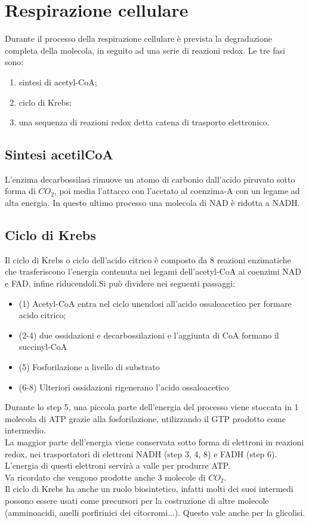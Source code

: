 \section{Respirazione cellulare}
Durante il processo della respirazione cellulare \`e prevista la degradazione completa della molecola, in seguito ad una serie di reazioni redox. Le tre fasi sono: 
\begin{enumerate}
    \item sintesi di acetyl-CoA;
    \item ciclo di Krebs; 
    \item una sequenza di reazioni redox detta catena di trasporto elettronico.
\end{enumerate}
\subsection{Sintesi acetilCoA}
L'enzima decarbossilasi rimuove un atomo di carbonio dall'acido piruvato sotto forma di $CO_2$, poi media l'attacco con l'acetato al coenzima-A con un legame ad alta energia. In questo ultimo processo una molecola di NAD\ap{+} \`e ridotta a NADH.
\subsection{Ciclo di Krebs}
Il ciclo di Krebs o ciclo dell'acido citrico \`e composto da 8 reazioni enzimatiche che trasferiscono l'energia contenuta nei legami dell'acetyl-CoA ai coenzimi NAD e FAD, infine riducendoli.Si pu\`o dividere nei seguenti passaggi:
\begin{itemize}
    \item (1) Acetyl-CoA entra nel ciclo unendosi all'acido ossaloacetico per formare acido citrico;
    \item (2-4) due ossidazioni e decarbossilazioni e l'aggiunta di CoA formano il succinyl-CoA
    \item (5) Fosforilazione a livello di substrato
    \item (6-8) Ulteriori ossidazioni rigenerano l'acido ossaloacetico
\end{itemize}
Durante lo step 5, una piccola parte dell'energia del processo viene stoccata in 1 molecola di ATP grazie alla fosforilazione, utilizzando il GTP prodotto come intermedio.
\\La maggior parte dell'energia viene conservata sotto forma di elettroni in reazioni redox, nei trasportatori di elettroni NADH (step 3, 4, 8) e FADH (step 6). L'energia di questi elettroni servir\`a a valle per produrre ATP.
\\Va ricordato che vengono prodotte anche 3 molecole di $CO_2$. 
\\Il ciclo di Krebs ha anche un ruolo biosintetico, infatti molti dei suoi intermedi possono essere usati come precursori per la costruzione di altre molecole (amminoacidi, anelli porfirinici dei citocromi...). Questo vale anche per la glicolisi. 
